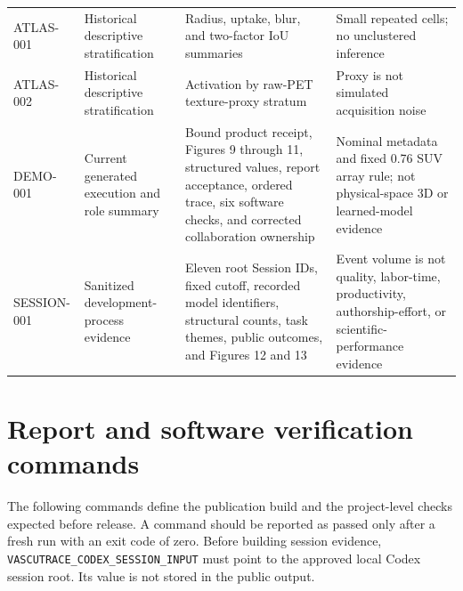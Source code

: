\documentclass[11pt]{article}
\begin{document}
\begin{longtable}{>{\ttfamily\raggedright\arraybackslash}p{} L{0.18\textwidth} L{0.24\textwidth} L{0.24\textwidth}}
ATLAS-001 & Historical descriptive stratification & Radius, uptake, blur, and two-factor IoU summaries & Small repeated cells; no unclustered inference \\
ATLAS-002 & Historical descriptive stratification & Activation by raw-PET texture-proxy stratum & Proxy is not simulated acquisition noise \\
DEMO-001 & Current generated execution and role summary & Bound product receipt, Figures 9 through 11, structured values, report acceptance, ordered trace, six software checks, and corrected collaboration ownership & Nominal metadata and fixed 0.76 SUV array rule; not physical-space 3D or learned-model evidence \\
SESSION-001 & Sanitized development-process evidence & Eleven root Session IDs, fixed cutoff, recorded model identifiers, structural counts, task themes, public outcomes, and Figures 12 and 13 & Event volume is not quality, labor-time, productivity, authorship-effort, or scientific-performance evidence \\
\bottomrule
\end{longtable}

\section{Report and software verification commands}
\label{app:commands}

The following commands define the publication build and the project-level checks expected before release. A command should be reported as passed only after a fresh run with an exit code of zero. Before building session evidence, \texttt{VASCUTRACE\_CODEX\_SESSION\_INPUT} must point to the approved local Codex session root. Its value is not stored in the public output.
\end{document}
